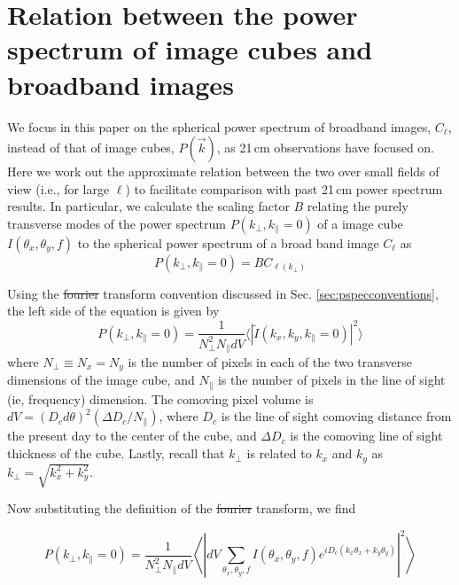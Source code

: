 \documentclass[numberedappendix]{emulateapj}
\providecommand{\DIFadd}[1]{{\protect\color{blue}\uwave{#1}}} %
\providecommand{\DIFdel}[1]{{\protect\color{red}\sout{#1}}}                      %
\providecommand{\DIFaddbegin}{} %
\providecommand{\DIFaddend}{} %
\providecommand{\DIFdelbegin}{} %
\providecommand{\DIFdelend}{} %
\begin{document}
\section{Relation between the power spectrum of image cubes and broadband images}
\label{sec:pspecrelation}

We focus in this paper on the spherical power spectrum of broadband images, $C_\ell$,  instead of that of image cubes, $P(\vec{k})$, as 21\,cm observations have focused on. Here we work out the approximate relation between the two over small fields of view (i.e., for large $\ell$) to facilitate comparison with past 21\,cm power spectrum results. In particular, we calculate the scaling factor $B$ relating the purely transverse modes of the power spectrum $P(k_\perp,k_\parallel=0)$ of a image cube $I(\theta_x,\theta_y,f)$ to the spherical power spectrum of a broad band image $C_\ell$ as
\begin{equation}
P(k_\perp,k_\parallel=0) = B C_{\ell(k_\perp)}
\end{equation}

Using the \DIFdelbegin \DIFdel{fourier }\DIFdelend \DIFaddbegin \DIFadd{Fourier }\DIFaddend transform convention discussed in Sec. \ref{sec:pspecconventions}, the left side of the equation is given by
\begin{equation}
P(k_\perp,k_\parallel=0) = \frac{1}{N_\perp^2 N_\parallel dV}\langle|\tilde{I}(k_x,k_y,k_\parallel=0)|^2\rangle
\end{equation}
where $N_\perp\equiv N_x=N_y$ is the number of pixels in each of the two transverse dimensions of the image cube, and $N_\parallel$ is the number of pixels in the line of sight (ie, frequency) dimension. The comoving pixel volume is $dV = (D_c d\theta)^2 (\Delta D_c/N_\parallel)$, where $D_c$ is the line of sight comoving distance from the present day to the center of the cube, and $\Delta D_c$ is the comoving line of sight thickness of the cube. Lastly, recall that $k_\perp$ is related to $k_x$ and $k_y$ as $k_\perp=\sqrt{k_x^2+k_y^2}$.

Now substituting the definition of the \DIFdelbegin \DIFdel{fourier }\DIFdelend \DIFaddbegin \DIFadd{Fourier }\DIFaddend transform, we find

\begin{equation}
P(k_\perp,k_\parallel=0) =\frac{1}{N_\perp^2 N_\parallel dV}\left\langle\left|dV\sum_{\theta_x,\theta_y,f}I(\theta_x,\theta_y,f)e^{iD_c(k_x\theta_x+k_y\theta_y)}\right|^2\right\rangle
\end{equation}
\end{document}
